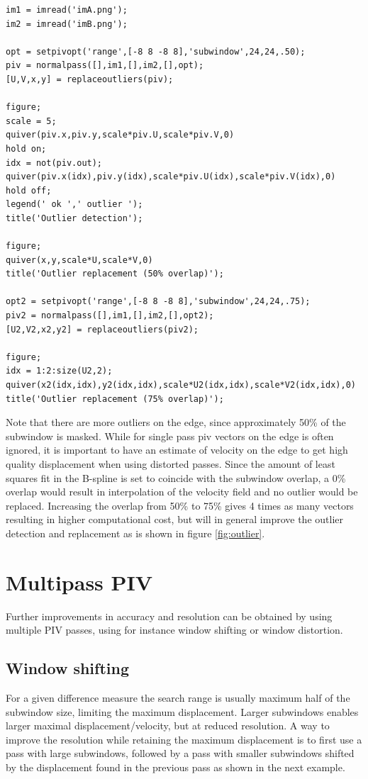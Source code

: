 \documentclass[10pt]{article}
\begin{document}
\begin{lstlisting}[caption=Outlier detection and replacement,label=zz]
im1 = imread('imA.png');
im2 = imread('imB.png');
 
opt = setpivopt('range',[-8 8 -8 8],'subwindow',24,24,.50); 
piv = normalpass([],im1,[],im2,[],opt); 
[U,V,x,y] = replaceoutliers(piv);
  
figure; 
scale = 5; 
quiver(piv.x,piv.y,scale*piv.U,scale*piv.V,0)
hold on; 
idx = not(piv.out);
quiver(piv.x(idx),piv.y(idx),scale*piv.U(idx),scale*piv.V(idx),0)
hold off;
legend(' ok ',' outlier ');
title('Outlier detection');

figure; 
quiver(x,y,scale*U,scale*V,0)
title('Outlier replacement (50% overlap)');

opt2 = setpivopt('range',[-8 8 -8 8],'subwindow',24,24,.75); 
piv2 = normalpass([],im1,[],im2,[],opt2); 
[U2,V2,x2,y2] = replaceoutliers(piv2);

figure;
idx = 1:2:size(U2,2);
quiver(x2(idx,idx),y2(idx,idx),scale*U2(idx,idx),scale*V2(idx,idx),0)
title('Outlier replacement (75% overlap)');
\end{lstlisting}

Note that there are more outliers on the edge, since approximately 50\% of the subwindow is masked.
While for single pass piv vectors on the edge is often ignored, it is important to have
an estimate of velocity on the edge to get high quality displacement when using distorted passes.
%
Since the amount of least squares fit in the B-spline is set to coincide with the subwindow overlap,
a 0\% overlap would result in interpolation of the velocity field and no outlier would be replaced.
Increasing the overlap from 50\% to 75\%  gives 4 times as many vectors resulting in higher computational cost,
but will in general improve the outlier detection and replacement as is shown in figure \ref{fig:outlier}.

\section{Multipass PIV}
  Further improvements in accuracy and resolution can be obtained by using multiple PIV passes, 
  using for instance window shifting or window distortion.
  
  \subsection{Window shifting}
  For a given difference measure the search range is usually maximum half of the subwindow size, limiting the maximum displacement.
  Larger subwindows enables larger maximal displacement/velocity, but at reduced resolution.
  A way to improve the resolution while retaining the maximum displacement is to first use a pass with large subwindows,
  followed by a pass with smaller subwindows shifted by the displacement found in the previous pass as shown in the next example.
          
\end{document}
